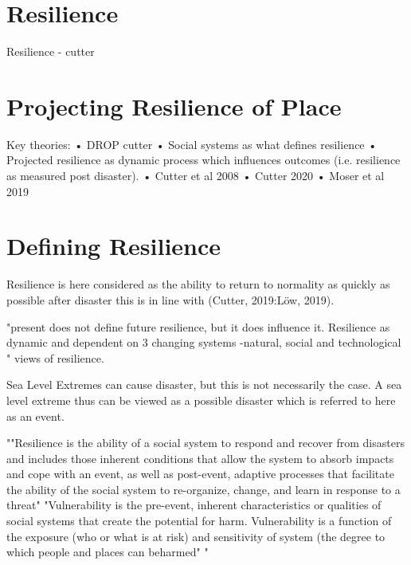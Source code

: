 \documentclass{article}
\begin{document}
\section{Resilience}
Resilience - cutter

\section{Projecting Resilience of Place}
Key theories:
•	DROP cutter
•	Social systems as what defines resilience
•	Projected resilience as dynamic process which influences outcomes (i.e. resilience as measured post disaster). 
•	Cutter et al 2008
•	Cutter 2020 
•	Moser et al 2019 

\section{Defining Resilience} 
Resilience is here considered as the ability to return to normality as quickly as possible after disaster this is in line with (Cutter, 2019:Löw, 2019).

"present does not define future resilience, but it does influence it. Resilience as dynamic and dependent on 3 changing systems -natural, social and technological
" \cite{cutter_community_2020} views of resilience.

Sea Level Extremes can cause disaster, but this is not necessarily the case. A sea level extreme thus can be viewed as a possible disaster which is referred to here as an event. 

""Resilience is the ability of a social system to respond and recover from disasters and includes those inherent conditions that allow the system to absorb impacts and cope with an event, as well as post-event, adaptive processes that facilitate the ability of the social system to re-organize, change, and learn in response to a threat" "Vulnerability is the pre-event, inherent characteristics or qualities of social systems that create the potential for harm. Vulnerability is a function of the exposure (who or what is at risk) and sensitivity of system (the degree to which people and places can beharmed" " \cite{cutter_place-based_2008}
\end{document}

